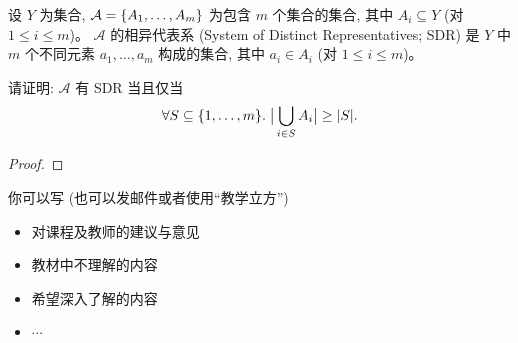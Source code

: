 \documentclass[a4paper, justified]{tufte-handout}
\begin{document}
\begin{problem}
  设 $Y$ 为集合,
  $\mathcal{A} = \{A_{1}, \dots, A_{m}\}$
  为包含 $m$ 个集合的集合, 其中 $A_{i} \subseteq Y$ (对 $1 \le i \le m$)。
  $\mathcal{A}$ 的相异代表系 (System of Distinct Representatives; SDR)
  是 $Y$ 中 $m$ 个不同元素 $a_{1}, \dots, a_{m}$ 构成的集合,
  其中 $a_{i} \in A_{i}$ (对 $1 \le i \le m$)。

  \noindent 请证明: $\mathcal{A}$ 有 SDR 当且仅当
  \[
    \forall S \subseteq \{1, \dots, m\}.\;
      \big\lvert \bigcup_{i \in S} A_{i} \big\rvert \ge |S|.
  \]
\end{problem}

\begin{proof}
\end{proof}

\begincorrection

\beginfb

你可以写 (也可以发邮件或者使用``教学立方'')
\begin{itemize}
  \item 对课程及教师的建议与意见
  \item 教材中不理解的内容
  \item 希望深入了解的内容
  \item $\cdots$
\end{itemize}
\end{document}
